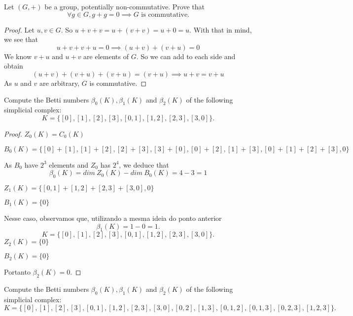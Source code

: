 \noindent\linia

\begin{exercise}
    Let $(G, +)$ be a group, potentially non-commutative. Prove that
    $$\forall g \in G, g + g = 0 \implies G \text{ is commutative.}$$
\end{exercise}

\begin{proof}

Let $u,v \in G$. So $u + v + v = u + (v + v) = u + 0 = u$. With that in mind,
we see that 
$$
u + v + v + u = 0 \implies (u + v) + (v + u) = 0 
$$
We know $v + u$ and $u + v$ are elements of $G$. So we can add to each side
and obtain 
$$
(u + v) + (v + u) + (v + u) = (v + u) \implies u + v = v + u
$$
As $u$ and $v$ are arbitrary, $G$ is commutative. 

\end{proof}

\noindent\linia

\begin{exercise}
    Compute the Betti numbers $\beta_0(K), \beta_1(K)$ and $\beta_2(K)$ of the
    following simplicial complex:
    $$
    K = \{[0], [1], [2], [3], [0, 1], [1, 2], [2, 3], [3, 0]\}.
    $$
\end{exercise}

\begin{proof}

$Z_0(K) = C_0(K)$

$B_0(K) = \{[0] + [1], [1] + [2], [2] + [3], [3] + [0], [0] + [2], [1] + [3],
[0] + [1] + [2] + [3], 0\}$

As $B_0$ have $2^3$ elements and $Z_0$ has $2^4$, we deduce that 
$$\beta_0(K) = dim ~Z_0(K) - dim ~B_0(K) = 4 - 3 = 1$$

$Z_1(K) = \{[0,1] + [1,2] + [2,3] + [3,0], 0\}$

$B_1(K) = \{0\}$

Nesse caso, observamos que, utilizando a mesma ideia do ponto anterior 
$$\beta_1(K) = 1 - 0 = 1.$$
$$
K = \{[0], [1], [2], [3], [0, 1], [1, 2], [2, 3], [3, 0]\}.
$$
$Z_2(K) = \{0\}$

$B_2(K) = \{0\}$

Portanto $\beta_2(K) = 0$. 

\end{proof}

\noindent\linia

\begin{exercise}
    Compute the Betti numbers $\beta_0(K), \beta_1(K)$ and $\beta_2(K)$ of the
    following simplicial complex:
    $$
    K = \{[0], [1], [2], [3], [0, 1], [1, 2], [2, 3], [3, 0], [0, 2], [1, 3], [0, 1, 2], [0, 1, 3], [0, 2, 3], [1, 2, 3]\}.
    $$
\end{exercise}

